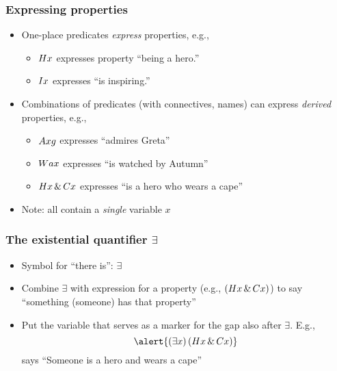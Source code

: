 \begin{frame}
\frametitle{Expressing properties}

  \begin{itemize}[<+->]
    \item One-place predicates \emph{express} properties, e.g.,
    \begin{itemize}[<+->]
      \item $Hx$ expresses property ``being a hero.''
      \item $Ix$ expresses ``is inspiring.''
    \end{itemize}
    \item Combinations of predicates (with connectives, names) can
    express \emph{derived} properties, e.g.,
    \begin{itemize}[<+->]
      \item $Axg$ expresses ``admires Greta''
      \item $Wax$ expresses ``is watched by Autumn''
      \item $Hx \,\&\, Cx$ expresses ``is a hero who wears a cape''
    \end{itemize}
    \item Note: all contain a \emph{single} variable $x$
  \end{itemize}
\end{frame}

\begin{frame}
  \frametitle{The existential quantifier $\exists$}

  \begin{itemize}[<+->]
    \item Symbol for ``there is'': \alert{$\exists$}
    \item Combine $\exists$ with expression for a property (e.g., $(Hx \,\&\,
    Cx)$) to say ``something (someone) has that property''
    \item Put the variable that serves as a marker for the gap also
    after $\exists$. E.g.,
    \[ \alert{\qt{\exists}{x}\,(H\qv{x} \eand C\qv{x})} \]
    says ``Someone is a hero and wears a cape''
  \end{itemize}
\end{frame}

